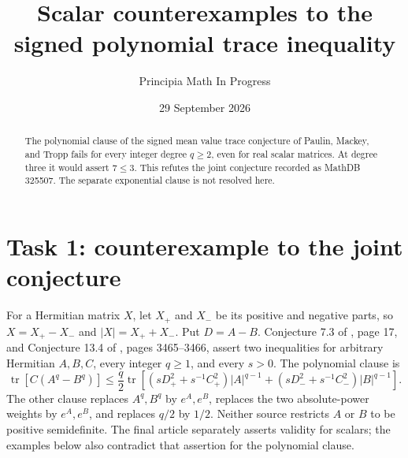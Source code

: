\documentclass[11pt]{article}
\title{Scalar counterexamples to the signed polynomial trace inequality}
\author{Principia Math In Progress}
\date{29 September 2026}
\DeclareMathOperator{\tr}{tr}
\begin{document}
\maketitle
\begin{abstract}
The polynomial clause of the signed mean value trace conjecture of
Paulin, Mackey, and Tropp fails for every integer degree $q\ge2$, even
for real scalar matrices. At degree three it would assert $7\le3$.
This refutes the joint conjecture recorded as MathDB 325507.
The separate exponential clause is not resolved here.
\end{abstract}

\section*{Task 1: counterexample to the joint conjecture}
For a Hermitian matrix $X$, let $X_+$ and $X_-$ be its positive and
negative parts, so $X=X_+-X_-$ and $|X|=X_++X_-$. Put $D=A-B$.
Conjecture 7.3 of \cite{PMT13}, page 17, and Conjecture 13.4 of
\cite{PMT16}, pages 3465--3466, assert two inequalities for arbitrary
Hermitian $A,B,C$, every integer $q\ge1$, and every $s>0$.
The polynomial clause is
\begin{equation}\label{P}
\tr[C(A^q-B^q)]\le\frac q2\tr\!\left[
 (sD_+^2+s^{-1}C_+^2)|A|^{q-1}
 +(sD_-^2+s^{-1}C_-^2)|B|^{q-1}\right].
\end{equation}
The other clause replaces $A^q,B^q$ by $e^A,e^B$, replaces the two
absolute-power weights by $e^A,e^B$, and replaces $q/2$ by $1/2$.
Neither source restricts $A$ or $B$ to be positive semidefinite.
The final article separately asserts validity for scalars; the examples
below also contradict that assertion for the polynomial clause.
\end{document}
